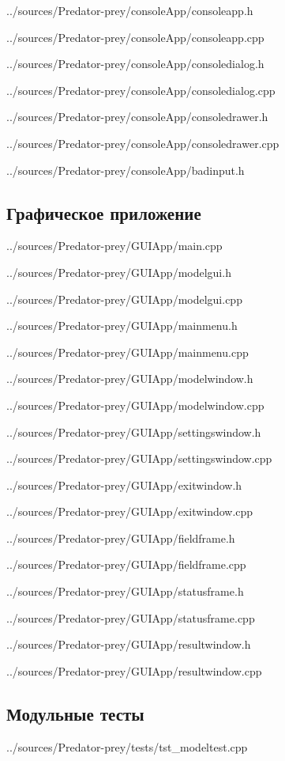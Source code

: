 \documentclass[a4paper]{article}
\begin{document}

{../sources/Predator-prey/consoleApp/consoleapp.h}

{../sources/Predator-prey/consoleApp/consoleapp.cpp}
\newpage


{../sources/Predator-prey/consoleApp/consoledialog.h}

{../sources/Predator-prey/consoleApp/consoledialog.cpp}
\newpage


{../sources/Predator-prey/consoleApp/consoledrawer.h}

{../sources/Predator-prey/consoleApp/consoledrawer.cpp}


{../sources/Predator-prey/consoleApp/badinput.h}
\newpage

\subsection{Графическое приложение}


{../sources/Predator-prey/GUIApp/main.cpp}


{../sources/Predator-prey/GUIApp/modelgui.h}

{../sources/Predator-prey/GUIApp/modelgui.cpp}
\newpage


{../sources/Predator-prey/GUIApp/mainmenu.h}

{../sources/Predator-prey/GUIApp/mainmenu.cpp}
\newpage


{../sources/Predator-prey/GUIApp/modelwindow.h}

{../sources/Predator-prey/GUIApp/modelwindow.cpp}
\newpage


{../sources/Predator-prey/GUIApp/settingswindow.h}

{../sources/Predator-prey/GUIApp/settingswindow.cpp}
\newpage


{../sources/Predator-prey/GUIApp/exitwindow.h}

{../sources/Predator-prey/GUIApp/exitwindow.cpp}
\newpage


{../sources/Predator-prey/GUIApp/fieldframe.h}

{../sources/Predator-prey/GUIApp/fieldframe.cpp}
\newpage


{../sources/Predator-prey/GUIApp/statusframe.h}

{../sources/Predator-prey/GUIApp/statusframe.cpp}
\newpage


{../sources/Predator-prey/GUIApp/resultwindow.h}

{../sources/Predator-prey/GUIApp/resultwindow.cpp}

\subsection{Модульные тесты}


{../sources/Predator-prey/tests/tst_modeltest.cpp}
\newpage
\end{document}
